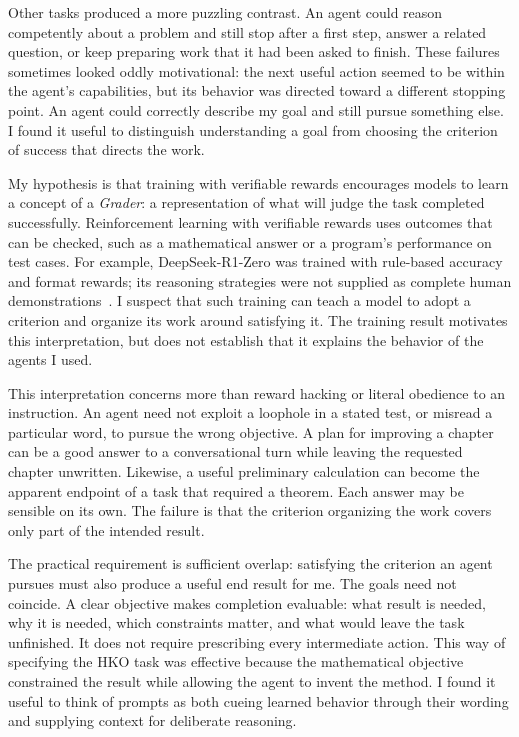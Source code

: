 Other tasks produced a more puzzling contrast. An agent could reason
competently about a problem and still stop after a first step, answer a
related question, or keep preparing work that it had been asked to finish.
These failures sometimes looked oddly motivational: the next useful action
seemed to be within the agent's capabilities, but its behavior was directed
toward a different stopping point. An agent could correctly describe my goal
and still pursue something else. I found it useful to distinguish understanding
a goal from choosing the criterion of success that directs the work.

My hypothesis is that training with verifiable rewards encourages models to
learn a concept of a \emph{Grader}: a representation of what will judge the
task completed successfully. Reinforcement learning with verifiable rewards
uses outcomes that can be checked, such as a mathematical answer or a
program's performance on test cases. For example, DeepSeek-R1-Zero was
trained with rule-based accuracy and format rewards; its reasoning strategies
were not supplied as complete human demonstrations~\cite{aiGuo2025}.
I suspect that such training can teach a model to adopt a criterion and
organize its work around satisfying it. The training result motivates this
interpretation, but does not establish that it explains the behavior of the
agents I used.

This interpretation concerns more than reward hacking or literal obedience
to an instruction. An agent need not exploit a loophole in a stated test, or
misread a particular word, to pursue the wrong objective. A plan for improving
a chapter can be a good answer to a conversational turn while leaving the
requested chapter unwritten. Likewise, a useful preliminary calculation can
become the apparent endpoint of a task that required a theorem. Each answer
may be sensible on its own. The failure is that the criterion organizing the
work covers only part of the intended result.

The practical requirement is sufficient overlap: satisfying the criterion an
agent pursues must also produce a useful end result for me. The goals need
not coincide. A clear objective makes completion evaluable: what result is
needed, why it is needed, which constraints matter, and what would leave the
task unfinished. It does not require prescribing
every intermediate action. This way of specifying the HKO task was effective
because the mathematical objective constrained the result while allowing the
agent to invent the method. I found it useful to think of prompts as both cueing
learned behavior through their wording and supplying context for deliberate
reasoning.

